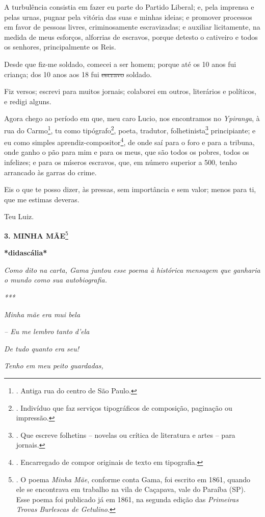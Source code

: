 A turbulência consistia em fazer eu parte do Partido Liberal; e, pela
imprensa e pelas urnas, pugnar pela vitória das suas e minhas ideias; e
promover processos em favor de pessoas livres, criminosamente
escravizadas; e auxiliar licitamente, na medida de meus esforços,
alforrias de escravos, porque detesto o cativeiro e todos os senhores,
principalmente os Reis.

Desde que fiz-me soldado, comecei a ser homem; porque até os 10 anos fui
criança; dos 10 anos aos 18 fui \sout{escravo} soldado.

Fiz versos; escrevi para muitos jornais; colaborei em outros, literários
e políticos, e redigi alguns.

Agora chego ao período em que, meu caro Lucio, nos encontramos no
\emph{Ypiranga}, à rua do Carmo\footnote{. Antiga rua do centro de São
  Paulo.}, tu como tipógrafo\footnote{. Indivíduo que faz serviços
  tipográficos de composição, paginação ou impressão.}, poeta, tradutor,
folhetinista\footnote{. Que escreve folhetins -- novelas ou crítica de
  literatura e artes -- para jornais.} principiante; e eu como simples
aprendiz-compositor\footnote{. Encarregado de compor originais de texto
  em tipografia.}, de onde saí para o foro e para a tribuna, onde ganho
o pão para mim e para os meus, que são todos os pobres, todos os
infelizes; e para os míseros escravos, que, em número superior a 500,
tenho arrancado às garras do crime.

Eis o que te posso dizer, às pressas, sem importância e sem valor; menos
para ti, que me estimas deveras.

Teu Luiz.

\textbf{3. MINHA MÃE}\footnote{. O poema \emph{Minha Mãe}, conforme
  conta Gama, foi escrito em 1861, quando ele se encontrava em trabalho
  na vila de Caçapava, vale do Paraíba (SP). Esse poema foi publicado já
  em 1861, na segunda edição das \emph{Primeiras Trovas Burlescas de
  Getulino}.}

\textbf{*didascália*}

\emph{Como dito na carta, Gama juntou esse poema à histórica mensagem
que ganharia o mundo como sua autobiografia. }

\emph{***}

\emph{Minha mãe era mui bela}

\emph{-- Eu me lembro tanto d'ela}

\emph{De tudo quanto era seu!}

\emph{Tenho em meu peito guardadas,}

